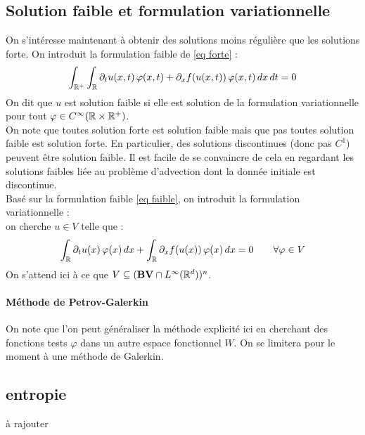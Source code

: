 \documentclass[11pt]{article}%
\begin{document}
\subsection{Solution faible et formulation variationnelle}
On s'intéresse maintenant à obtenir des solutions moins régulière que les solutions forte. On introduit la formulation faible de \eqref{eq forte} : 
\begin{equation}\label{eq faible}
    \int_{\mathbb{R}^+}\int_{\mathbb{R}} \partial_tu(x,t) \,\varphi(x,t) +\partial_xf(u(x,t))\,\varphi(x,t)\,dx\,dt   = 0 
\end{equation}
On dit que $u$ est solution faible si elle est solution de la formulation variationnelle pour tout $\varphi\in C^\infty(\mathbb{R}\times \mathbb{R}^+)$.\\

On note que toutes solution forte est solution faible mais que pas toutes solution faible est solution forte. 
En particulier, des solutions discontinues (donc pas $C^1$) peuvent être solution faible. 
Il est facile de se convaincre de cela en regardant les solutions faibles liée au problème d'advection dont la donnée initiale est discontinue.\\

Basé sur la formulation faible \eqref{eq faible}, on introduit la formulation variationnelle :\\ on cherche $u \in V$ telle que : 
\begin{equation}\label{Formulation Variationnelle}
    \int_{\mathbb{R}} \partial_tu(x) \,\varphi(x) \,dx+ \int_{\mathbb{R}} \partial_xf(u(x))\, \varphi(x) \,dx  = 0 \qquad \forall\varphi \in V
\end{equation}
On s'attend ici à ce que $V\subseteq (\mathbf{BV}\cap L^\infty(\mathbb{R}^d))^n$.

\paragraph{Méthode de Petrov-Galerkin \\}
On note que l'on peut généraliser la méthode explicité ici en cherchant des fonctions tests $\varphi$ dans un autre espace fonctionnel $W$. On se limitera pour le moment à une méthode de Galerkin.

\subsection{entropie}
{\color{red} à rajouter}
\end{document}
